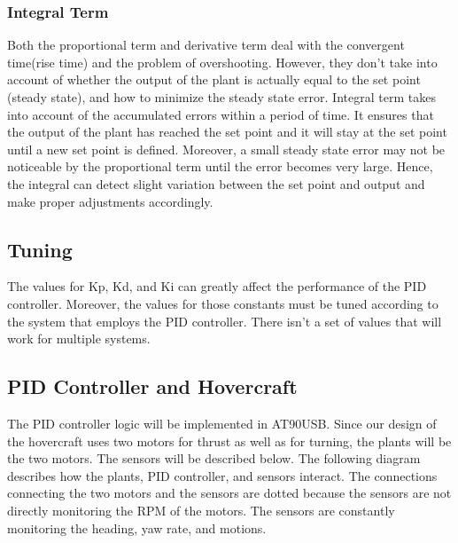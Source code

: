 \subsubsection{Integral Term}
Both the proportional term and derivative term deal with the convergent time(rise time) and the problem of overshooting. However, they don't take into account of whether the output of the plant is actually equal to the set point (steady state), and how to minimize the steady state error. Integral term takes into account of the accumulated errors within a period of time. It ensures that the output of the plant has reached the set point and it will stay at the set point until a new set point is defined. Moreover, a small steady state error may not be noticeable by the proportional term until the error becomes very large. Hence, the integral can detect slight variation between the set point and output and make proper adjustments accordingly. 

\subsection{Tuning}
The values for Kp, Kd, and Ki can greatly affect the performance of the PID controller. Moreover, the values for those constants must be tuned according to the system that employs the PID controller. There isn't a set of values that will work for multiple systems. 

\subsection{PID Controller and Hovercraft}
The PID controller logic will be implemented in AT90USB. Since our design of the hovercraft uses two motors for thrust as well as for turning, the plants will be the two motors. The sensors will be described below. The following diagram describes how the plants, PID controller, and sensors interact. The connections connecting the two motors and the sensors are dotted because the sensors are not directly monitoring the RPM of the motors. The sensors are constantly monitoring the heading, yaw rate, and motions. 

